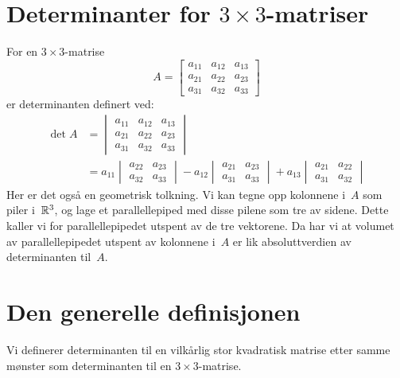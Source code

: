 \section*{Determinanter for $3 \times 3$-matriser}

For en $3 \times 3$-matrise
\[
A =
\begin{bmatrix}
a_{11} & a_{12} & a_{13} \\
a_{21} & a_{22} & a_{23} \\
a_{31} & a_{32} & a_{33}
\end{bmatrix}
\]
er determinanten definert ved:
\begin{align*}
\det A &=
\begin{vmatrix}
a_{11} & a_{12} & a_{13} \\
a_{21} & a_{22} & a_{23} \\
a_{31} & a_{32} & a_{33}
\end{vmatrix}
\\
&=
a_{11}
\begin{vmatrix}
a_{22} & a_{23} \\
a_{32} & a_{33}
\end{vmatrix}
- a_{12}
\begin{vmatrix}
a_{21} & a_{23} \\
a_{31} & a_{33}
\end{vmatrix}
+ a_{13}
\begin{vmatrix}
a_{21} & a_{22} \\
a_{31} & a_{32}
\end{vmatrix}
\end{align*}
Her er det også en geometrisk tolkning.  Vi kan tegne opp kolonnene
i~$A$ som piler i~$\mathbb{R}^3$, og lage et parallellepiped med disse pilene
som tre av sidene.  Dette kaller vi for parallellepipedet utspent av
de tre vektorene.  Da har vi at volumet av parallellepipedet utspent
av kolonnene i~$A$ er lik absoluttverdien av determinanten til~$A$.


\section*{Den generelle definisjonen}

Vi definerer determinanten til en vilkårlig stor kvadratisk matrise
etter samme mønster som determinanten til en $3 \times 3$-matrise.


